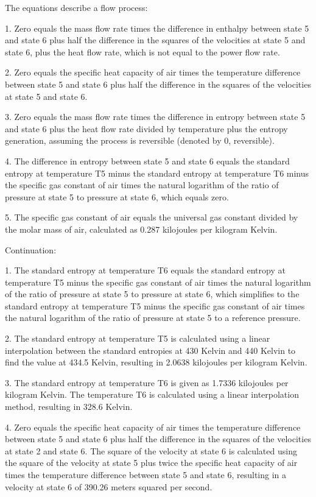 The equations describe a flow process:

1. Zero equals the mass flow rate times the difference in enthalpy between state 5 and state 6 plus half the difference in the squares of the velocities at state 5 and state 6, plus the heat flow rate, which is not equal to the power flow rate.

2. Zero equals the specific heat capacity of air times the temperature difference between state 5 and state 6 plus half the difference in the squares of the velocities at state 5 and state 6.

3. Zero equals the mass flow rate times the difference in entropy between state 5 and state 6 plus the heat flow rate divided by temperature plus the entropy generation, assuming the process is reversible (denoted by 0, reversible).

4. The difference in entropy between state 5 and state 6 equals the standard entropy at temperature T5 minus the standard entropy at temperature T6 minus the specific gas constant of air times the natural logarithm of the ratio of pressure at state 5 to pressure at state 6, which equals zero.

5. The specific gas constant of air equals the universal gas constant divided by the molar mass of air, calculated as 0.287 kilojoules per kilogram Kelvin.

Continuation:

1. The standard entropy at temperature T6 equals the standard entropy at temperature T5 minus the specific gas constant of air times the natural logarithm of the ratio of pressure at state 5 to pressure at state 6, which simplifies to the standard entropy at temperature T5 minus the specific gas constant of air times the natural logarithm of the ratio of pressure at state 5 to a reference pressure.

2. The standard entropy at temperature T5 is calculated using a linear interpolation between the standard entropies at 430 Kelvin and 440 Kelvin to find the value at 434.5 Kelvin, resulting in 2.0638 kilojoules per kilogram Kelvin.

3. The standard entropy at temperature T6 is given as 1.7336 kilojoules per kilogram Kelvin. The temperature T6 is calculated using a linear interpolation method, resulting in 328.6 Kelvin.

4. Zero equals the specific heat capacity of air times the temperature difference between state 5 and state 6 plus half the difference in the squares of the velocities at state 2 and state 6. The square of the velocity at state 6 is calculated using the square of the velocity at state 5 plus twice the specific heat capacity of air times the temperature difference between state 5 and state 6, resulting in a velocity at state 6 of 390.26 meters squared per second.